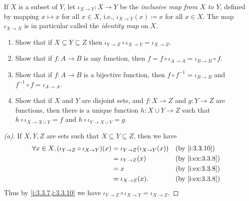 \begin{ex}\label{i:ex:3.3.8}
  If \(X\) is a subset of \(Y\), let \(\iota_{X \to Y} : X \to Y\) be the \emph{inclusive map from \(X\) to \(Y\)}, defined by mapping \(x \mapsto x\) for all \(x \in X\), i.e., \(\iota_{X \to Y}(x) \coloneqq x\) for all \(x \in X\).
  The map \(\iota_{X \to X}\) is in particular called the \emph{identity map} on \(X\).
  \begin{enumerate}
    \item Show that if \(X \subseteq Y \subseteq Z\) then \(\iota_{Y \to Z} \circ \iota_{X \to Y} = \iota_{X \to Z}\).
    \item Show that if \(f : A \to B\) is any function, then \(f = f \circ \iota_{A \to A} = \iota_{B \to B} \circ f\).
    \item Show that if \(f : A \to B\) is a bijective function, then \(f \circ f^{-1} = \iota_{B \to B}\) and \(f^{-1} \circ f = \iota_{A \to A}\).
    \item Show that if \(X\) and \(Y\) are disjoint sets, and \(f : X \to Z\) and \(g : Y \to Z\) are functions, then there is a unique function \(h : X \cup Y \to Z\) such that \(h \circ \iota_{X \to X \cup Y} = f\) and \(h \circ \iota_{Y \to X \cup Y} = g\).
  \end{enumerate}
\end{ex}

\begin{proof}[(a)]
  If \(X, Y, Z\) are sets such that \(X \subseteq Y \subseteq Z\), then we have
  \begin{align*}
    \forall x \in X, (\iota_{Y \to Z} \circ \iota_{X \to Y})(x) & = \iota_{Y \to Z}(\iota_{X \to Y}(x)) &  & \by{i:3.3.10}   \\
                                                                & = \iota_{Y \to Z}(x)                  &  & \by{i:ex:3.3.8} \\
                                                                & = x                                   &  & \by{i:ex:3.3.8} \\
                                                                & = \iota_{X \to Z}(x).                 &  & \by{i:ex:3.3.8}
  \end{align*}
  Thus by \cref{i:3.3.7,i:3.3.10} we have \(\iota_{Y \to Z} \circ \iota_{X \to Y} = \iota_{X \to Z}\).
\end{proof}

